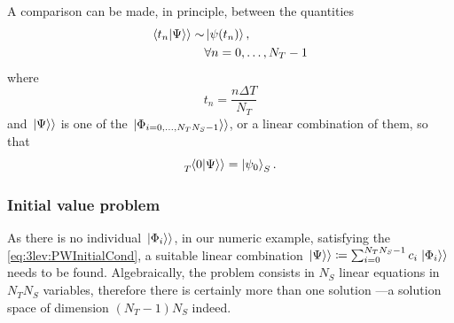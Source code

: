 A comparison can be made, in principle, between the quantities
\begin{align}\begin{split}\label{eq:3lev:PWComparison}
  \!\left.\left\langle t_n \middle| \Psi \right\rangle\right\rangle \sim  &\ket{\psi(t_n)},\\
                            &\forall n = 0, \dots, N_{T}-1
\end{split}\end{align}
where \[ t_{n} = \frac{n\Delta T}{N_T} \]
and
$\left.\left| \Psi \right\rangle\right\rangle$ is one of the ${\left.\left| \Phi_{i=0,\dots,N_T N_S - 1} \right\rangle\right\rangle}$,
or a linear combination of them,
so that
\begin{equation}\label{eq:3lev:PWInitialCond}
  \prescript{}{T}{\!\left.\left\langle 0 \middle| \Psi \right\rangle\right\rangle} = \ket{\psi_0}_S \text{.}
\end{equation}

\subsubsection*{Initial value problem}

As there is no individual $\left.\left| \Phi_i \right\rangle\right\rangle$,
in our numeric example,
satisfying the \eqref{eq:3lev:PWInitialCond},
a suitable linear combination
$\left.\left| \Psi \right\rangle\right\rangle \coloneqq \sum_{i=0}^{N_{T}N_{S}-1} c_{i}\left.\left| \Phi_i \right\rangle\right\rangle$
needs to be found. Algebraically, the problem consists in
$N_{S}$ linear equations
in $N_{T}N_{S}$ variables, therefore there is certainly more than one solution
---a solution space of dimension $(N_{T} - 1)N_{S}$ indeed.

